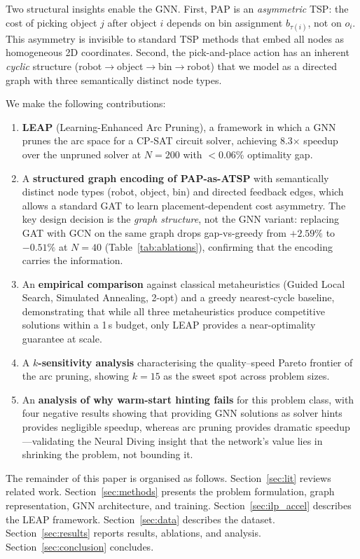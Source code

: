 \documentclass[conference]{IEEEtran}
\begin{document}
Two structural insights enable the GNN. First, PAP is an \emph{asymmetric} TSP: the cost of picking object $j$ after object $i$ depends on bin assignment $b_{\tau(i)}$, not on $o_i$. This asymmetry is invisible to standard TSP methods that embed all nodes as homogeneous 2D coordinates. Second, the pick-and-place action has an inherent \emph{cyclic} structure (robot$\to$object$\to$bin$\to$robot) that we model as a directed graph with three semantically distinct node types.

We make the following contributions:
\begin{enumerate}
    \item \textbf{LEAP} (Learning-Enhanced Arc Pruning), a framework in which a GNN prunes the arc space for a CP-SAT circuit solver, achieving 8.3$\times$ speedup over the unpruned solver at $N{=}200$ with $<$0.06\% optimality gap.
    \item A \textbf{structured graph encoding of PAP-as-ATSP} with semantically distinct node types (robot, object, bin) and directed feedback edges, which allows a standard GAT to learn placement-dependent cost asymmetry. The key design decision is the \emph{graph structure}, not the GNN variant: replacing GAT with GCN on the same graph drops gap-vs-greedy from $+2.59\%$ to $-0.51\%$ at $N{=}40$ (Table~\ref{tab:ablations}), confirming that the encoding carries the information.
    \item An \textbf{empirical comparison} against classical metaheuristics (Guided Local Search, Simulated Annealing, 2-opt) and a greedy nearest-cycle baseline, demonstrating that while all three metaheuristics produce competitive solutions within a 1\,s budget, only LEAP provides a near-optimality guarantee at scale.
    \item A \textbf{$k$-sensitivity analysis} characterising the quality--speed Pareto frontier of the arc pruning, showing $k{=}15$ as the sweet spot across problem sizes.
    \item An \textbf{analysis of why warm-start hinting fails} for this problem class, with four negative results showing that providing GNN solutions as solver hints provides negligible speedup, whereas arc pruning provides dramatic speedup---validating the Neural Diving insight \cite{nair2021neural} that the network's value lies in shrinking the problem, not bounding it.
\end{enumerate}

The remainder of this paper is organised as follows. Section~\ref{sec:lit} reviews related work. Section~\ref{sec:methods} presents the problem formulation, graph representation, GNN architecture, and training. Section~\ref{sec:ilp_accel} describes the LEAP framework. Section~\ref{sec:data} describes the dataset. Section~\ref{sec:results} reports results, ablations, and analysis. Section~\ref{sec:conclusion} concludes.
\end{document}
